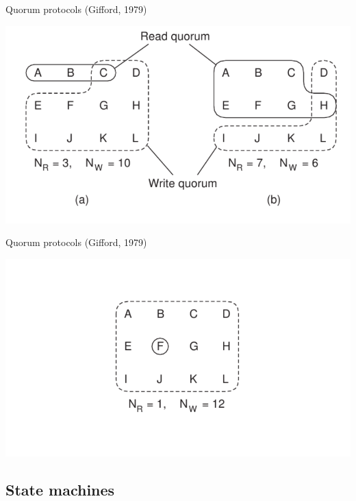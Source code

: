 \begin{frame}{Quorum protocols (Gifford, 1979)}

\includegraphics[width=\textwidth]{figs/09/quorum1}

\end{frame}

\begin{frame}{Quorum protocols (Gifford, 1979)}

\includegraphics[width=\textwidth]{figs/09/quorum2}

\end{frame}

\subsection{State machines}

